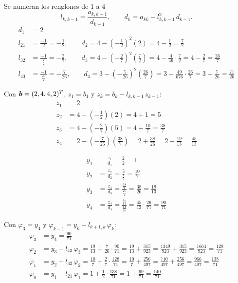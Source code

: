 Se numeran los renglones de $1$ a $4$ 
\[
l_{k,k-1} = \frac{a_{k,k-1}}{d_{k-1}}, \qquad d_k = a_{kk} - l_{k,k-1}^2\,d_{k-1} .
\]
\begin{align*}
	d_1 &= 2\\
	l_{21} &= \frac{-1}{2} = -\frac12, \qquad d_2 = 4 - \left(-\tfrac12\right)^2(2) = 4 - \tfrac12 = \tfrac72\\
	l_{32} &= \frac{-1}{\frac72} = -\frac27, \qquad d_3 = 4 - \left(-\tfrac27\right)^2\left(\tfrac72\right) = 4 - \tfrac{4}{49}\cdot\tfrac72 = 4 - \tfrac27 = \tfrac{26}{7}\\
	l_{43} &= \frac{-1}{\frac{26}{7}} = -\frac{7}{26}, \qquad d_4 = 3 - \left(-\tfrac{7}{26}\right)^2\left(\tfrac{26}{7}\right) = 3 - \tfrac{49}{676}\cdot\tfrac{26}{7} = 3 - \tfrac{7}{26} = \tfrac{71}{26}
\end{align*}

Con $\bm{b} = (2, 4, 4, 2)^T$, $z_1 = b_1$ y $z_k = b_k - l_{k,k-1}\,z_{k-1}$:
\begin{align*}
	z_1 &= 2\\
	z_2 &= 4 - \left(-\tfrac12\right)(2) = 4 + 1 = 5\\
	z_3 &= 4 - \left(-\tfrac27\right)(5) = 4 + \tfrac{10}{7} = \tfrac{38}{7}\\
	z_4 &= 2 - \left(-\tfrac{7}{26}\right)\left(\tfrac{38}{7}\right) = 2 + \tfrac{38}{26} = 2 + \tfrac{19}{13} = \tfrac{45}{13}
\end{align*}

\begin{align*}
	y_1 &= \frac{z_1}{d_1} = \frac{2}{2} = 1\\
	y_2 &= \frac{z_2}{d_2} = \frac{5}{\frac72} = \frac{10}{7}\\
	y_3 &= \frac{z_3}{d_3} = \frac{\frac{38}{7}}{\frac{26}{7}} = \frac{38}{26} = \frac{19}{13}\\
	y_4 &= \frac{z_4}{d_4} = \frac{\frac{45}{13}}{\frac{71}{26}} = \frac{45}{13}\cdot\frac{26}{71} = \frac{90}{71}
\end{align*}

Con $\varphi_3 = y_4$ y $\varphi_{k-1} = y_k - l_{k+1,k}\,\varphi_k$:
\begin{align*}
	\varphi_3 &= y_4 = \frac{90}{71}\\
	\varphi_2 &= y_3 - l_{43}\,\varphi_3 = \frac{19}{13} + \frac{7}{26}\cdot\frac{90}{71} = \frac{19}{13} + \frac{315}{923} = \frac{1349}{923} + \frac{315}{923} = \frac{1664}{923} = \frac{128}{71}\\
	\varphi_1 &= y_2 - l_{32}\,\varphi_2 = \frac{10}{7} + \frac27\cdot\frac{128}{71} = \frac{10}{7} + \frac{256}{497} = \frac{710}{497} + \frac{256}{497} = \frac{966}{497} = \frac{138}{71}\\
	\varphi_0 &= y_1 - l_{21}\,\varphi_1 = 1 + \frac12\cdot\frac{138}{71} = 1 + \frac{69}{71} = \frac{140}{71}
\end{align*}


